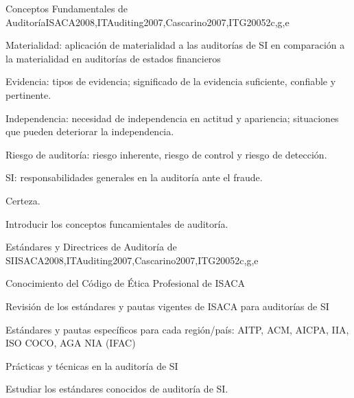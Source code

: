 \begin{syllabus}
	\begin{unit}{Conceptos Fundamentales de Auditoría}{}{ISACA2008,ITAuditing2007,Cascarino2007,ITG2005}{2}{c,g,e}
		\begin{topics}
			\item Materialidad: aplicación de materialidad a las auditorías de SI en comparación a la materialidad en auditorías de estados financieros
			\item Evidencia: tipos de evidencia; significado de la evidencia suficiente, confiable y pertinente.
			\item Independencia: necesidad de independencia en actitud y apariencia; situaciones que pueden deteriorar la independencia.
			\item Riesgo de auditoría: riesgo inherente, riesgo de control y riesgo de detección.
			\item SI: responsabilidades generales en la auditoría ante el fraude.
			\item Certeza.
		\end{topics}
		\begin{learningoutcomes}
		\item Introducir los conceptos funcamientales de auditoría.
		\end{learningoutcomes}
	\end{unit}
	
	\begin{unit}{Estándares y Directrices de Auditoría de SI}{}{ISACA2008,ITAuditing2007,Cascarino2007,ITG2005}{2}{c,g,e}
	\begin{topics}
	\item Conocimiento del Código de Ética Profesional de ISACA
	\item Revisión de los estándares y pautas vigentes de ISACA para auditorías de SI
	\item Estándares y pautas específicos para cada región/país: AITP, ACM, AICPA, IIA, ISO COCO, AGA NIA (IFAC)
	\item Prácticas y técnicas en la auditoría de SI
	\end{topics}
	\begin{learningoutcomes}
	\item Estudiar los estándares conocidos de auditoría de SI.
	\end{learningoutcomes}
	\end{unit}
	

\end{syllabus}
